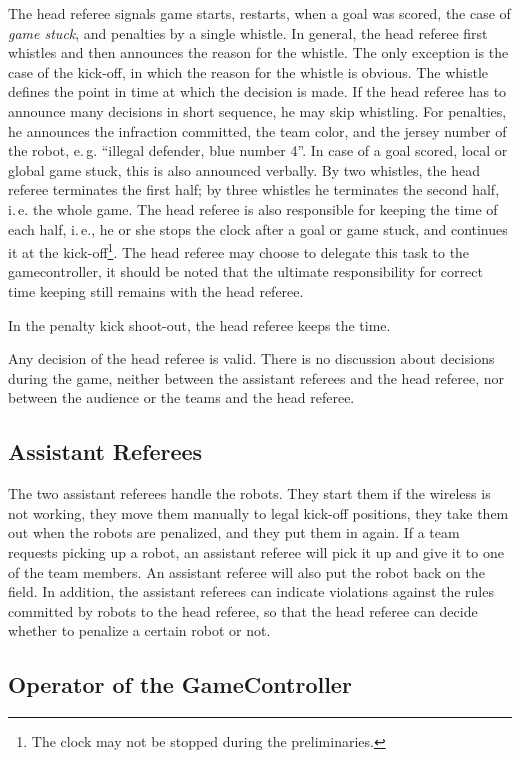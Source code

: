 \documentclass[12pt]{article}
\newcommand{\ie}{\mbox{i.\,e.}\xspace}
\newcommand{\eg}{\mbox{e.\,g.}\xspace}
\begin{document}
The head referee signals game starts, restarts, when a goal was
scored, the case of \emph{game stuck}, and penalties by a single
whistle. In general, the head referee first whistles and then
announces the reason for the whistle. The only exception is the case
of the kick-off, in which the reason for the whistle is obvious. The
whistle defines the point in time at which the decision is made. If
the head referee has to announce many decisions in short sequence,
he may skip whistling. For penalties, he announces the infraction
committed, the team color, and the jersey number of the robot, \eg
``illegal defender, blue number 4''. In case of a goal scored, local
or global game stuck, this is also announced verbally. By two
whistles, the head referee terminates the first half; by three
whistles he terminates the second half, \ie the whole game. The head
referee is also responsible for keeping the time of each half, \ie,
he or she stops the clock after a goal or game stuck, and continues
it at the kick-off\footnote{The clock may not be stopped during the
preliminaries.}. The head referee may choose to delegate this task
to the gamecontroller, it should be noted that the ultimate
responsibility for correct time keeping still remains with the head
referee.

In the penalty kick shoot-out, the head referee keeps the time.

Any decision of the head referee is valid. There is no discussion
about decisions during the game, neither between the assistant
referees and the head referee, nor between the audience or the teams
and the head referee.

\subsection{Assistant Referees}

The two assistant referees handle the robots. They start them if the
wireless is not working, they move them manually to legal kick-off
positions, they take them out when the robots are penalized, and
they put them in again. If a team requests picking up a robot, an
assistant referee will pick it up and give it to one of the team
members. An assistant referee will also put the robot back on the
field. In addition, the assistant referees can indicate violations
against the rules committed by robots to the head referee, so that
the head referee can decide whether to penalize a certain robot or
not.

\subsection{Operator of the GameController}
\end{document}
